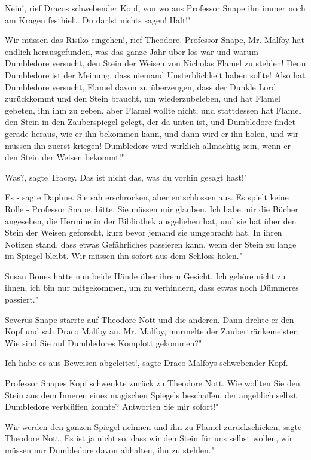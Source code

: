 \glqq Nein!\grqq{}, rief Dracos schwebender Kopf, von wo aus Professor Snape ihn
immer noch am Kragen festhielt. \glqq Du darfst nichts sagen! Halt!"

\glqq Wir müssen das Risiko eingehen!\grqq{}, rief Theodore. \glqq Professor
Snape, Mr. Malfoy hat endlich herausgefunden, was das ganze Jahr über los war
und warum - Dumbledore versucht, den Stein der Weisen von Nicholas Flamel zu
stehlen! Denn Dumbledore ist der Meinung, dass niemand Unsterblichkeit haben
sollte! Also hat Dumbledore versucht, Flamel davon zu überzeugen, dass der
Dunkle Lord zurückkommt und den Stein braucht, um wiederzubeleben, und hat
Flamel gebeten, ihn ihm zu geben, aber Flamel wollte nicht, und stattdessen hat
Flamel den Stein in den Zauberspiegel gelegt, der da unten ist, und Dumbledore
findet gerade heraus, wie er ihn bekommen kann, und dann wird er ihn holen, und
wir müssen ihn zuerst kriegen! Dumbledore wird wirklich allmächtig sein, wenn er
den Stein der Weisen bekommt!"

\glqq Was?\grqq{}, sagte Tracey. \glqq Das ist nicht das, was du vorhin gesagt
hast!"

\glqq Es -\grqq{} sagte Daphne. Sie sah erschrocken, aber entschlossen aus.
\glqq Es spielt keine Rolle - Professor Snape, bitte, Sie müssen mir glauben.
Ich habe mir die Bücher angesehen, die Hermine in der Bibliothek ausgeliehen
hat, und sie hat über den Stein der Weisen geforscht, kurz bevor jemand sie
umgebracht hat. In ihren Notizen stand, dass etwas Gefährliches passieren kann,
wenn der Stein zu lange im Spiegel bleibt. Wir müssen ihn sofort aus dem Schloss
holen."

Susan Bones hatte nun beide Hände über ihrem Gesicht. \glqq Ich gehöre nicht zu
ihnen, ich bin nur mitgekommen, um zu verhindern, dass etwas noch Dümmeres
passiert."

Severus Snape starrte auf Theodore Nott und die anderen. Dann drehte er den Kopf
und sah Draco Malfoy an. \glqq Mr. Malfoy\grqq{}, murmelte der
Zaubertränkemeister. \glqq Wie sind Sie auf Dumbledores Komplott gekommen?"

\glqq Ich habe es aus Beweisen abgeleitet!\grqq{}, sagte Draco Malfoys
schwebender Kopf.

Professor Snapes Kopf schwenkte zurück zu Theodore Nott. \glqq Wie wollten Sie
den Stein aus dem Inneren eines magischen Spiegels beschaffen, der angeblich
selbst Dumbledore verblüffen konnte? Antworten Sie mir sofort!"

\glqq Wir werden den ganzen Spiegel nehmen und ihn zu Flamel
zurückschicken\grqq{}, sagte Theodore Nott. \glqq Es ist ja nicht so, dass wir
den Stein für uns selbst wollen, wir müssen nur Dumbledore davon abhalten, ihn
zu stehlen."

